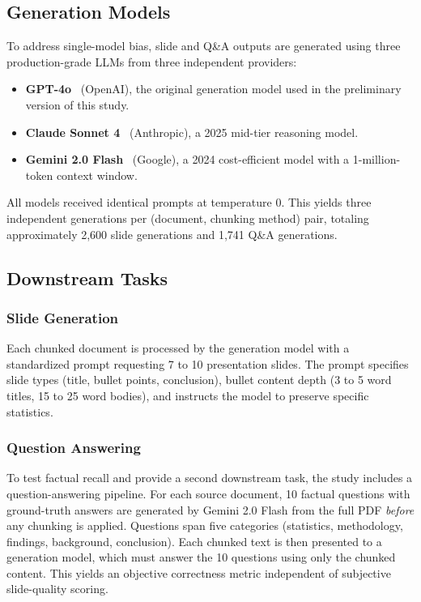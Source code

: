 \documentclass{ieeeaccess}
\begin{document}
\subsection{Generation Models}
\label{sec:gen-models}

To address single-model bias, slide and Q\&A outputs are generated using three production-grade LLMs from three independent providers:
\begin{itemize}
    \item \textbf{GPT-4o}~\cite{b28} (OpenAI), the original generation model used in the preliminary version of this study.
    \item \textbf{Claude Sonnet 4}~\cite{b29} (Anthropic), a 2025 mid-tier reasoning model.
    \item \textbf{Gemini 2.0 Flash}~\cite{b27} (Google), a 2024 cost-efficient model with a 1-million-token context window.
\end{itemize}
All models received identical prompts at temperature 0. This yields three independent generations per (document, chunking method) pair, totaling approximately 2,600 slide generations and 1,741 Q\&A generations.

\subsection{Downstream Tasks}

\subsubsection{Slide Generation}

Each chunked document is processed by the generation model with a standardized prompt requesting 7 to 10 presentation slides. The prompt specifies slide types (title, bullet points, conclusion), bullet content depth (3 to 5 word titles, 15 to 25 word bodies), and instructs the model to preserve specific statistics.

\subsubsection{Question Answering}

To test factual recall and provide a second downstream task, the study includes a question-answering pipeline. For each source document, 10 factual questions with ground-truth answers are generated by Gemini 2.0 Flash from the full PDF \emph{before} any chunking is applied. Questions span five categories (statistics, methodology, findings, background, conclusion). Each chunked text is then presented to a generation model, which must answer the 10 questions using only the chunked content. This yields an objective correctness metric independent of subjective slide-quality scoring.
\end{document}
